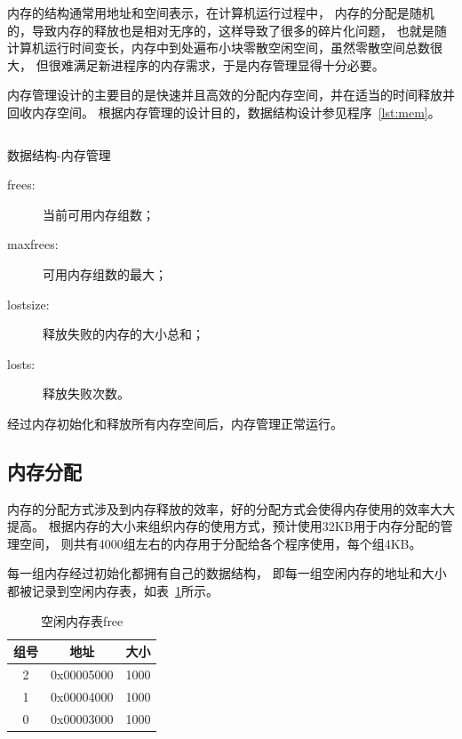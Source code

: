 内存的结构通常用地址和空间表示，在计算机运行过程中，
内存的分配是随机的，导致内存的释放也是相对无序的，这样导致了很多的碎片化问题，
也就是随计算机运行时间变长，内存中到处遍布小块零散空闲空间，虽然零散空间总数很大，
但很难满足新进程序的内存需求，于是内存管理显得十分必要。

内存管理设计的主要目的是快速并且高效的分配内存空间，并在适当的时间释放并回收内存空间。
根据内存管理的设计目的，数据结构设计参见程序~\ref{lst:mem}。

\begin{listing}[H]
  \inputminted[tabsize=2, firstline=137, lastline=143,
    linenos=true]{c}{../ZOS/src/kernel/bootpack.h}
  \caption{数据结构-内存管理}
  \label{lst:mem}
\end{listing}

\begin{description}
\item[frees:]当前可用内存组数；
\item[maxfrees:]可用内存组数的最大；
\item[lostsize:]释放失败的内存的大小总和；
\item[losts:]释放失败次数。
\end{description}

经过内存初始化和释放所有内存空间后，内存管理正常运行。

\subsection{内存分配}

内存的分配方式涉及到内存释放的效率，好的分配方式会使得内存使用的效率大大提高。
根据内存的大小来组织内存的使用方式，预计使用32KB用于内存分配的管理空间，
则共有4000组左右的内存用于分配给各个程序使用，每个组4KB。

每一组内存经过初始化都拥有自己的数据结构，
即每一组空闲内存的地址和大小都被记录到空闲内存表，如表~\ref{tab:free}所示。

\begin{table}[h]
  \centering
  \begin{tabular}{ccc}
    \hline
    组号 & 地址 & 大小 \\\hline
    2 & 0x00005000 & 1000 \\
    1 & 0x00004000 & 1000 \\
    0 & 0x00003000 & 1000 \\\hline    
  \end{tabular}
  \caption{空闲内存表free}
  \label{tab:free}
\end{table}

